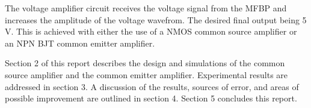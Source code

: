 The voltage amplifier circuit receives the voltage signal from the MFBP and increases the amplitude of the voltage wavefrom. The desired final output being 5 V. This is achieved with either the use of a NMOS common source amplifier or an NPN BJT common emitter amplifier.


Section 2 of this report describes the design and simulations of the common source amplifier and the common emitter amplifier. Experimental results are addressed in section 3. A discussion of the results, sources of error, and areas of possible improvement are outlined in section 4. Section 5 concludes this report. \newline



